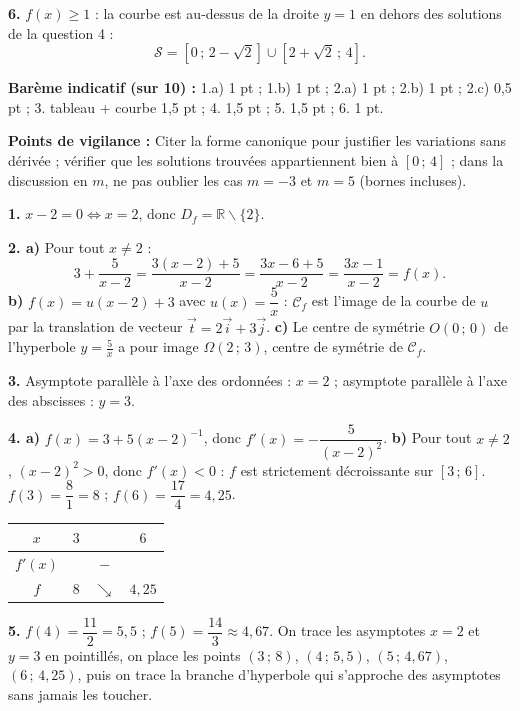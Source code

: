 \documentclass[11pt]{article}
\def\setminus{\mathbin{\backslash}}\let\smallsetminus\setminus
\begin{document}
\begin{corrige}
\textbf{6.} $f(x)\geq 1$ : la courbe est au-dessus de la droite $y=1$ en dehors des solutions de la question 4 :
\[ \mathcal{S}=[0\,;\,2-\sqrt{2}]\cup[2+\sqrt{2}\,;\,4]. \]

\textbf{Barème indicatif (sur 10) :} 1.a) 1 pt ; 1.b) 1 pt ; 2.a) 1 pt ; 2.b) 1 pt ; 2.c) 0,5 pt ; 3. tableau + courbe 1,5 pt ; 4. 1,5 pt ; 5. 1,5 pt ; 6. 1 pt.

\textbf{Points de vigilance :} Citer la forme canonique pour justifier les variations sans dérivée ; vérifier que les solutions trouvées appartiennent bien à $[0\,;\,4]$ ; dans la discussion en $m$, ne pas oublier les cas $m=-3$ et $m=5$ (bornes incluses).
\end{corrige}

\begin{corrige}
\textbf{1.} $x-2=0\Leftrightarrow x=2$, donc $D_{f}=\mathbb{R}\setminus\{2\}$.

\textbf{2. a)} Pour tout $x\neq 2$ :
\[ 3+\frac{5}{x-2}=\frac{3(x-2)+5}{x-2}=\frac{3x-6+5}{x-2}=\frac{3x-1}{x-2}=f(x). \]
\textbf{b)} $f(x)=u(x-2)+3$ avec $u(x)=\dfrac{5}{x}$ : $\mathcal{C}_{f}$ est l'image de la courbe de $u$ par la translation de vecteur $\vec{t}=2\vec{i}+3\vec{j}$.
\textbf{c)} Le centre de symétrie $O(0\,;\,0)$ de l'hyperbole $y=\frac{5}{x}$ a pour image $\Omega(2\,;\,3)$, centre de symétrie de $\mathcal{C}_{f}$.

\textbf{3.} Asymptote parallèle à l'axe des ordonnées : $x=2$ ; asymptote parallèle à l'axe des abscisses : $y=3$.

\textbf{4. a)} $f(x)=3+5(x-2)^{-1}$, donc $f'(x)=-\dfrac{5}{(x-2)^{2}}$.
\textbf{b)} Pour tout $x\neq 2$, $(x-2)^{2}>0$, donc $f'(x)<0$ : $f$ est strictement décroissante sur $[3\,;\,6]$. $f(3)=\dfrac{8}{1}=8$ ; $f(6)=\dfrac{17}{4}=4,25$.
\begin{center}
\begin{tabular}{|c|ccc|}\hline $x$ & $3$ & & $6$ \\ \hline $f'(x)$ & & $-$ & \\ \hline $f$ & $8$ & $\searrow$ & $4,25$ \\ \hline\end{tabular}
\end{center}

\textbf{5.} $f(4)=\dfrac{11}{2}=5,5$ ; $f(5)=\dfrac{14}{3}\approx 4,67$. On trace les asymptotes $x=2$ et $y=3$ en pointillés, on place les points $(3\,;\,8)$, $(4\,;\,5,5)$, $(5\,;\,4,67)$, $(6\,;\,4,25)$, puis on trace la branche d'hyperbole qui s'approche des asymptotes sans jamais les toucher.


\end{corrige}
\end{document}
